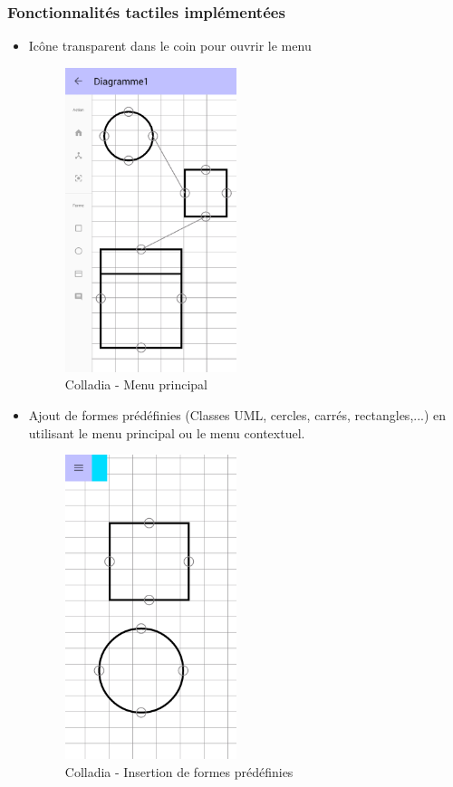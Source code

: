 \subsubsection{Fonctionnalités tactiles implémentées}
\begin{itemize}
\item Icône transparent dans le coin pour ouvrir le menu
		\begin{figure}[!h]
			\centering
			\includegraphics[width=5cm]{img/screen/new/colladia_draw_view_menu_main}
			\caption{Colladia - Menu principal}
		\end{figure}
\item Ajout de formes prédéfinies (Classes UML, cercles, carrés, rectangles,...) en utilisant le menu principal ou le menu contextuel.
		\begin{figure}[!h]
			\centering
			\includegraphics[width=5cm]{img/screen/colladia_draw_view_element_2}
			\caption{Colladia - Insertion de formes prédéfinies}
		\end{figure}



\end{itemize}
